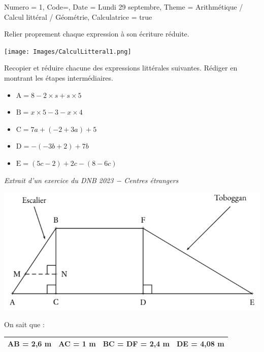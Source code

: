 \documentclass[11pt]{article}
\begin{document}
\begin{Maquette}[IE]{
        Numero = 1, Code={}, Date = Lundi 29 septembre, Theme = Arithmétique / Calcul littéral / Géométrie, Calculatrice = true
    }
    \begin{multicols}{2}
        \begin{exercice}
             Relier proprement chaque expression à son écriture réduite.
            \begin{center}
                \texttt{[image: Images/CalculLitteral1.png]}
            \end{center}
        \end{exercice}
        \columnbreak
        \begin{exercice}
            Recopier et réduire chacune des expressions littérales suivantes. Rédiger en montrant les étapes intermédiaires.
            \begin{itemize}
                \item $\textrm{A}=8 - 2 \times s + s \times 5$
                \item $\textrm{B}=x \times 5 - 3 - x \times 4$
                \item $\textrm{C}= 7a + (-2 + 3a) + 5$
                \item $\textrm{D}= - (- 3b + 2) + 7b$
                \item $\textrm{E}=(5c - 2) + 2c - (8 - 6c)$
            \end{itemize}
        \end{exercice}
    \end{multicols}

    \begin{exercice}
            \emph{Extrait d’un exercice du DNB 2023 − Centres étrangers}
            \begin{center}
                \includegraphics[width=.75\linewidth]{Images/Géométrie1.png}
            \end{center}
             On sait que :
            \begin{center}
                      \renewcommand{\arraystretch}{1.2}
                      \begin{tabular}{|*{4}{c|}}
                          \hline
                      AB = 2,6 m       & AC = 1 m             &  BC = DF = 2,4 m & DE = 4,08 m         \\
                          \hline
                      \end{tabular}
                  \end{center}
 

\end{exercice}
\end{Maquette}
\end{document}
